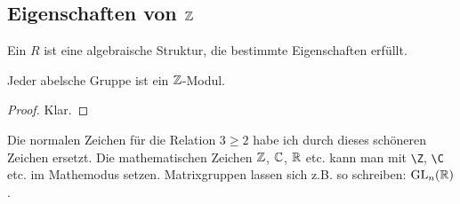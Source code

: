 
\subsection{Eigenschaften von $\operatorname{\mathbb{Z}}$}



\begin{defin}
Ein  $R$ ist eine algebraische Struktur, die bestimmte Eigenschaften erfüllt.
\end{defin}

\begin{stz}
Jeder abelsche Gruppe ist ein $\operatorname{\mathbb{Z}}$-Modul.
\end{stz}
\begin{proof}\cite[vgl.][Prop. 0.0.0]{lang2005}
Klar.
\end{proof}

Die normalen Zeichen für die Relation $3\geq 2$ habe ich durch dieses schöneren Zeichen ersetzt. Die mathematischen Zeichen $\operatorname{\mathbb{Z}}$, $\operatorname{\mathbb{C}}$, $\operatorname{\mathbb{R}}$ etc. kann man mit \texttt{\textbackslash Z}, \texttt{\textbackslash C} etc. im Mathemodus setzen. Matrixgruppen lassen sich z.B. so schreiben: $\operatorname{GL}_n(\operatorname{\mathbb{R}})$.

\blindtext[6]